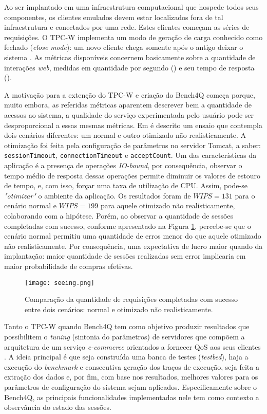 Ao ser implantado em uma infraestrutura computacional que hospede todos seus componentes, os clientes emulados devem estar localizados fora de tal infraestrutura e conectados por uma rede. Estes clientes começam as séries de requisições. O TPC-W implementa um modo de geração de carga conhecido como fechado (\textit{close mode}): um novo cliente chega somente após o antigo deixar o sistema \cite{Zhang2011}. As métricas disponíveis concernem basicamente sobre a quantidade de interações \textit{web}, medidas em quantidade por segundo () e seu tempo de resposta ().

A motivação para a extenção do TPC-W e criação do Bench4Q começa porque, muito embora, as referidas métricas aparentem descrever bem a quantidade de acessos ao sistema, a qualidade do serviço experimentada pelo usuário pode ser desproporcional a essas mesmas métricas. Em  é descrito um ensaio que contempla dois cenários diferentes: um normal e outro otimizado não realisticamente. A otimização foi feita pela configuração de parâmetros no servidor Tomcat, a saber: \texttt{sessionTimeout}, \texttt{connectionTimeout} e \texttt{acceptCount}. Um das características da aplicação é a presença de operações \textit{ IO-bound}, por consequência, observar o tempo médio de resposta dessas operações permite diminuir os valores de estouro de tempo, e, com isso, forçar uma taxa de utilização de CPU. Assim, pode-se \textit{"otimizar"} o ambiente da aplicação. Os resultados foram de $WIPS = 131$ para o cenário normal e $WIPS=199$ para aquele otimizado não realisticamente, colaborando com a hipótese. Porém, ao observar a quantidade de sessões completadas com sucesso, conforme apresentado na Figura \ref{fig:seeing}, percebe-se que o cenário normal permitiu uma quantidade de erros menor do que aquele otimizado não realisticamente. Por consequência, uma expectativa de lucro maior quando da implantação: maior quantidade de sessões realizadas sem error implicaria em maior probabilidade de compras efetivas.

\begin{figure}[htb]
	\centering
	\texttt{[image: seeing.png]}
	\caption{Comparação da quantidade de requisições completadas com sucesso entre dois cenários: normal e otimizado não realisticamente.}
	\label{fig:seeing}
\end{figure}


Tanto o TPC-W quando Bench4Q tem como objetivo produzir resultados que possibilitem o \textit{tuning} (sintonia do parâmetros) de servidores que compõem a arquitetura de um serviço \textit{e-commerce} orientados a fornecer QoS aos seus clientes \cite{Menasce2002, Zhang2011}.  A ideia principal é que seja construída uma banca de testes (\textit{testbed}), haja a execução do \textit{benchmark} e consecutiva geração dos traços de execução, seja feita a extração dos dados e, por fim, com base nos resultados, melhores valores para os parâmetros de configuração do sistema sejam aplicados. Especificamente sobre o Bench4Q, as principais funcionalidades implementadas nele tem como contexto a observância do estado das sessões.

